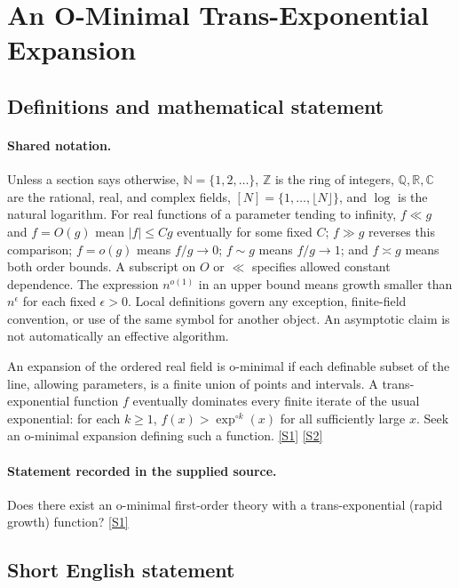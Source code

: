 \documentclass[11pt,a4paper]{article}
\newcommand{\N}{\mathbb{N}}
\newcommand{\Z}{\mathbb{Z}}
\newcommand{\Q}{\mathbb{Q}}
\newcommand{\R}{\mathbb{R}}
\newcommand{\C}{\mathbb{C}}
\newcommand{\sref}[2]{\hyperlink{source:#1:#2}{[S#2]}}
\begin{document}
\section{An O-Minimal Trans-Exponential Expansion}\label{statement}


\subsection{Definitions and mathematical statement}

\paragraph{Shared notation.}Unless a section says otherwise, $\N=\{1,2,\ldots\}$,
$\Z$ is the ring of integers, $\Q,\R,\C$ are the rational, real, and complex
fields, $[N]=\{1,\ldots,\lfloor N\rfloor\}$, and $\log$ is the natural
logarithm. For real functions of a parameter tending to infinity,
$f\ll g$ and $f=O(g)$ mean $|f|\leq Cg$ eventually for some fixed $C$;
$f\gg g$ reverses this comparison; $f=o(g)$ means $f/g\to0$;
$f\sim g$ means $f/g\to1$; and $f\asymp g$ means both order bounds.
A subscript on $O$ or $\ll$ specifies allowed constant dependence.
The expression $n^{o(1)}$ in an upper bound means growth smaller than
$n^\epsilon$ for each fixed $\epsilon>0$. Local definitions govern any
exception, finite-field convention, or use of the same symbol for another
object. An asymptotic claim is not automatically an effective algorithm.



An expansion of the ordered real field is o-minimal if each definable subset of the line, allowing parameters, is a finite union of points and intervals. A trans-exponential function $f$ eventually dominates every finite iterate of the usual exponential: for each $k\geq1$, $f(x)>\exp^{\circ k}(x)$ for all sufficiently large $x$. Seek an o-minimal expansion defining such a function. \sref{statement}{1} \sref{statement}{2}

\paragraph{Statement recorded in the supplied source.}
Does there exist an o-minimal first-order theory with a trans-exponential (rapid growth) function? \sref{statement}{1}

\subsection{Short English statement}
\end{document}
